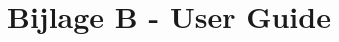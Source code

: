 \documentclass[a4paper]{report}
\begin{document}
\section{Bijlage B - User Guide}
\label{bijlage:userguide}
\begin{minipage}{\textwidth}
  \centering
\end{minipage}

\end{document}
